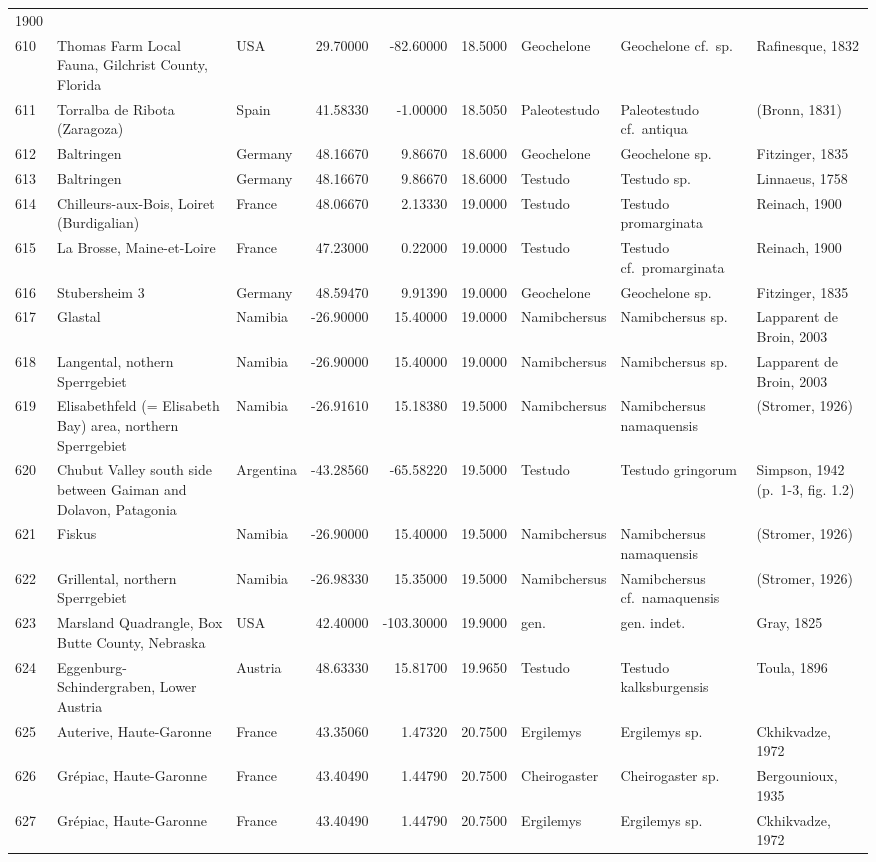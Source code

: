 \documentclass[]{article}
\begin{document}
\begin{longtable}[]{@{}lllrrrlll@{}}
1900\tabularnewline
610 & Thomas Farm Local Fauna, Gilchrist County, Florida & USA &
29.70000 & -82.60000 & 18.5000 & Geochelone & Geochelone cf.~sp. &
Rafinesque, 1832\tabularnewline
611 & Torralba de Ribota (Zaragoza) & Spain & 41.58330 & -1.00000 &
18.5050 & Paleotestudo & Paleotestudo cf.~antiqua & (Bronn,
1831)\tabularnewline
612 & Baltringen & Germany & 48.16670 & 9.86670 & 18.6000 & Geochelone &
Geochelone sp. & Fitzinger, 1835\tabularnewline
613 & Baltringen & Germany & 48.16670 & 9.86670 & 18.6000 & Testudo &
Testudo sp. & Linnaeus, 1758\tabularnewline
614 & Chilleurs-aux-Bois, Loiret (Burdigalian) & France & 48.06670 &
2.13330 & 19.0000 & Testudo & Testudo promarginata & Reinach,
1900\tabularnewline
615 & La Brosse, Maine-et-Loire & France & 47.23000 & 0.22000 & 19.0000
& Testudo & Testudo cf.~promarginata & Reinach, 1900\tabularnewline
616 & Stubersheim 3 & Germany & 48.59470 & 9.91390 & 19.0000 &
Geochelone & Geochelone sp. & Fitzinger, 1835\tabularnewline
617 & Glastal & Namibia & -26.90000 & 15.40000 & 19.0000 & Namibchersus
& Namibchersus sp. & Lapparent de Broin, 2003\tabularnewline
618 & Langental, nothern Sperrgebiet & Namibia & -26.90000 & 15.40000 &
19.0000 & Namibchersus & Namibchersus sp. & Lapparent de Broin,
2003\tabularnewline
619 & Elisabethfeld (= Elisabeth Bay) area, northern Sperrgebiet &
Namibia & -26.91610 & 15.18380 & 19.5000 & Namibchersus & Namibchersus
namaquensis & (Stromer, 1926)\tabularnewline
620 & Chubut Valley south side between Gaiman and Dolavon, Patagonia &
Argentina & -43.28560 & -65.58220 & 19.5000 & Testudo & Testudo
gringorum & Simpson, 1942 (p.~1-3, fig. 1.2)\tabularnewline
621 & Fiskus & Namibia & -26.90000 & 15.40000 & 19.5000 & Namibchersus &
Namibchersus namaquensis & (Stromer, 1926)\tabularnewline
622 & Grillental, northern Sperrgebiet & Namibia & -26.98330 & 15.35000
& 19.5000 & Namibchersus & Namibchersus cf.~namaquensis & (Stromer,
1926)\tabularnewline
623 & Marsland Quadrangle, Box Butte County, Nebraska & USA & 42.40000 &
-103.30000 & 19.9000 & gen. & gen. indet. & Gray, 1825\tabularnewline
624 & Eggenburg-Schindergraben, Lower Austria & Austria & 48.63330 &
15.81700 & 19.9650 & Testudo & Testudo kalksburgensis & Toula,
1896\tabularnewline
625 & Auterive, Haute-Garonne & France & 43.35060 & 1.47320 & 20.7500 &
Ergilemys & Ergilemys sp. & Ckhikvadze, 1972\tabularnewline
626 & Grépiac, Haute-Garonne & France & 43.40490 & 1.44790 & 20.7500 &
Cheirogaster & Cheirogaster sp. & Bergounioux, 1935\tabularnewline
627 & Grépiac, Haute-Garonne & France & 43.40490 & 1.44790 & 20.7500 &
Ergilemys & Ergilemys sp. & Ckhikvadze, 1972\tabularnewline

\end{longtable}
\end{document}
